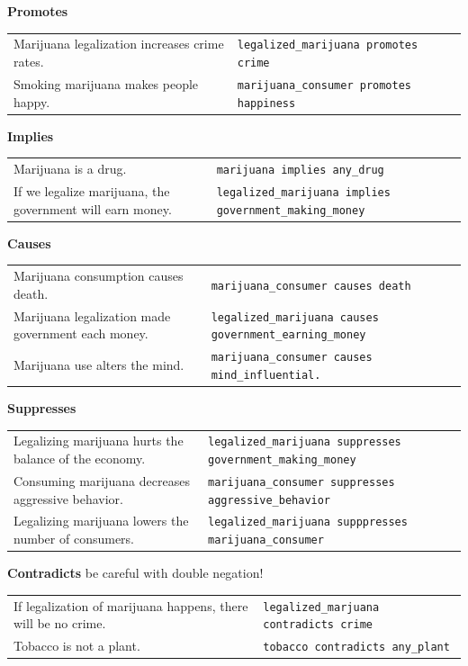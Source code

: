 \noindent \textbf{Promotes} \\
\begin{tabular}{p{8cm} p{8cm}}
Marijuana legalization increases crime rates. & \texttt{legalized\_marijuana promotes crime} \\
Smoking marijuana makes people happy. & \texttt{marijuana\_consumer promotes happiness}
\end{tabular}

\noindent \textbf{Implies} \\
\begin{tabular}{p{8cm} p{8cm}}
Marijuana is a drug. & \texttt{marijuana implies any\_drug} \\
	If we legalize marijuana, the government will earn money.  &\texttt{legalized\_marijuana implies government\_making\_money}
\end{tabular}
 
\noindent \textbf{Causes} \\
\begin{tabular}{p{8cm} p{8cm}}
	Marijuana consumption causes death. & \texttt{marijuana\_consumer causes death}  \\
	Marijuana legalization made government each money. & \texttt{legalized\_marijuana causes government\_earning\_money}\\
	Marijuana use alters the mind. & \texttt{marijuana\_consumer causes mind\_influential. }
\end{tabular}

\noindent \textbf{Suppresses}  \\
\begin{tabular}{p{8cm} p{8cm}}
	Legalizing marijuana hurts the balance of the economy. & \texttt{legalized\_marijuana suppresses government\_making\_money} \\
	Consuming marijuana decreases aggressive behavior. & \texttt{marijuana\_consumer suppresses aggressive\_behavior} \\
	Legalizing marijuana lowers the number of consumers. & \texttt{legalized\_marijuana supppresses marijuana\_consumer}
\end{tabular}

\noindent \textbf{Contradicts} be careful with double negation! \\
\begin{tabular}{p{8cm} p{8cm}}
	If legalization of marijuana happens, there will be no crime. & \texttt{legalized\_marjuana contradicts crime} \\
	Tobacco is not a plant. & \texttt{tobacco contradicts any\_plant}
\end{tabular}

